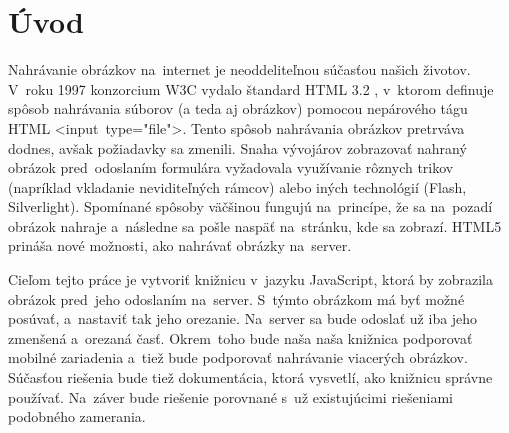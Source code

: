 \chapter{Úvod}

Nahrávanie obrázkov na~internet je neoddeliteľnou súčasťou našich životov. V~roku 1997 konzorcium W3C vydalo štandard HTML 3.2 \cite{html32}, v~ktorom definuje spôsob nahrávania súborov (a teda aj obrázkov) pomocou nepárového tágu HTML \hbox{<input type="file"\textgreater}. Tento spôsob nahrávania obrázkov pretrváva dodnes, avšak požiadavky sa zmenili. Snaha vývojárov zobrazovať nahraný obrázok pred~odoslaním formulára vyžadovala využívanie rôznych trikov (napríklad vkladanie neviditeľných rámcov) alebo iných technológií (Flash, Silverlight). Spomínané spôsoby väčšinou fungujú na~princípe, že sa na~pozadí obrázok nahraje a~následne sa pošle naspäť na~stránku, kde sa zobrazí. HTML5 prináša nové možnosti, ako nahrávať obrázky na~server.

Cieľom tejto práce je vytvoriť knižnicu v~jazyku JavaScript, ktorá by zobrazila obrázok pred~jeho odoslaním na~server. S~týmto obrázkom má byť možné posúvať, a~nastaviť tak jeho orezanie. Na~server sa bude odoslať už iba jeho zmenšená a~orezaná časť. Okrem~toho bude naša naša knižnica podporovať mobilné zariadenia a~tiež bude podporovať nahrávanie viacerých obrázkov. Súčasťou riešenia bude tiež dokumentácia, ktorá vysvetlí, ako knižnicu správne používať. Na~záver bude riešenie porovnané s~už existujúcimi riešeniami podobného zamerania.